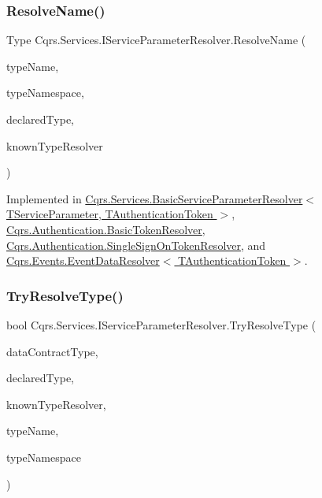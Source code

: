 \subsubsection{\texorpdfstring{Resolve\+Name()}{ResolveName()}}
{\footnotesize\ttfamily Type Cqrs.\+Services.\+I\+Service\+Parameter\+Resolver.\+Resolve\+Name (\begin{DoxyParamCaption}\item[{string}]{type\+Name,  }\item[{string}]{type\+Namespace,  }\item[{Type}]{declared\+Type,  }\item[{Data\+Contract\+Resolver}]{known\+Type\+Resolver }\end{DoxyParamCaption})}



Implemented in \hyperlink{classCqrs_1_1Services_1_1BasicServiceParameterResolver_a8c598f2f49a83190c315afc88e5630d5_a8c598f2f49a83190c315afc88e5630d5}{Cqrs.\+Services.\+Basic\+Service\+Parameter\+Resolver$<$ T\+Service\+Parameter, T\+Authentication\+Token $>$}, \hyperlink{classCqrs_1_1Authentication_1_1BasicTokenResolver_aeb429e2f8dca2c8e96682be8d7a590bb_aeb429e2f8dca2c8e96682be8d7a590bb}{Cqrs.\+Authentication.\+Basic\+Token\+Resolver}, \hyperlink{classCqrs_1_1Authentication_1_1SingleSignOnTokenResolver_abd546dcdabb00db2e8d0288cbe373895_abd546dcdabb00db2e8d0288cbe373895}{Cqrs.\+Authentication.\+Single\+Sign\+On\+Token\+Resolver}, and \hyperlink{classCqrs_1_1Events_1_1EventDataResolver_ade34415acd009dd3f9f3a43169da43e9_ade34415acd009dd3f9f3a43169da43e9}{Cqrs.\+Events.\+Event\+Data\+Resolver$<$ T\+Authentication\+Token $>$}.

\mbox{\label{interfaceCqrs_1_1Services_1_1IServiceParameterResolver_a31c82a00b192b877faff6df99e1b689b_a31c82a00b192b877faff6df99e1b689b}} 
\subsubsection{\texorpdfstring{Try\+Resolve\+Type()}{TryResolveType()}}
{\footnotesize\ttfamily bool Cqrs.\+Services.\+I\+Service\+Parameter\+Resolver.\+Try\+Resolve\+Type (\begin{DoxyParamCaption}\item[{Type}]{data\+Contract\+Type,  }\item[{Type}]{declared\+Type,  }\item[{Data\+Contract\+Resolver}]{known\+Type\+Resolver,  }\item[{out Xml\+Dictionary\+String}]{type\+Name,  }\item[{out Xml\+Dictionary\+String}]{type\+Namespace }\end{DoxyParamCaption})}



